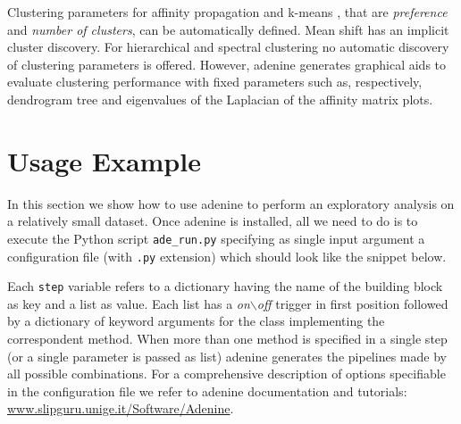 \documentclass[twoside,11pt]{article}
\makeatletter
\newcommand{\ade}{{\sc adenine}\@\xspace}
\newcommand{\py}{{Python}\@\xspace}
\makeatother
\begin{document}
  Clustering parameters for affinity propagation \citep{frey2007clustering} and k-means \citep{bishop2006pattern}, that are \emph{preference} and \emph{number of clusters}, can be automatically defined. Mean shift \citep{comaniciu2002mean} has an implicit cluster discovery.
  For hierarchical \citep{friedman2001elements} and spectral clustering \citep{shi2000normalized} no automatic discovery of clustering parameters is offered. However, \ade generates graphical aids to evaluate clustering performance with fixed parameters such as, respectively, dendrogram tree and eigenvalues of the Laplacian of the affinity matrix plots.




\section{Usage Example}
In this section we show how to use \ade to perform an exploratory analysis on a relatively small dataset. Once \ade is installed, all we need to do is to execute the \py script \texttt{ade\_run.py} specifying as single input argument a configuration file (with \texttt{.py} extension) which should look like the snippet below.



\noindent Each \texttt{step} variable refers to a dictionary having the name of the building block as key and a {list} as value. Each list has a \emph{on$\backslash$off} trigger in first position followed by a dictionary of keyword arguments for the class implementing the correspondent method. When more than one method is specified in a single step (or a single parameter is passed as {list}) \ade generates the pipelines made by all possible combinations.
For a comprehensive description of options specifiable in the configuration file we refer to \ade documentation and tutorials: {\small\url{www.slipguru.unige.it/Software/Adenine}}. %
\end{document}
